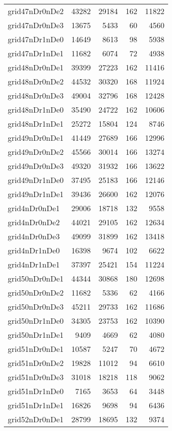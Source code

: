 \begin{longtable}{lrrrr}
grid47nDr0nDe2 & 43282 & 29184 & 162 & 11822 \\
grid47nDr0nDe3 & 13675 & 5433 & 60 & 4560 \\
grid47nDr1nDe0 & 14649 & 8613 & 98 & 5938 \\
grid47nDr1nDe1 & 11682 & 6074 & 72 & 4938 \\
grid48nDr0nDe1 & 39399 & 27223 & 162 & 11416 \\
grid48nDr0nDe2 & 44532 & 30320 & 168 & 11924 \\
grid48nDr0nDe3 & 49004 & 32796 & 168 & 12428 \\
grid48nDr1nDe0 & 35490 & 24722 & 162 & 10606 \\
grid48nDr1nDe1 & 25272 & 15804 & 124 & 8746 \\
grid49nDr0nDe1 & 41449 & 27689 & 166 & 12996 \\
grid49nDr0nDe2 & 45566 & 30014 & 166 & 13274 \\
grid49nDr0nDe3 & 49320 & 31932 & 166 & 13622 \\
grid49nDr1nDe0 & 37495 & 25183 & 166 & 12146 \\
grid49nDr1nDe1 & 39436 & 26600 & 162 & 12076 \\
grid4nDr0nDe1 & 29006 & 18718 & 132 & 9558 \\
grid4nDr0nDe2 & 44021 & 29105 & 162 & 12634 \\
grid4nDr0nDe3 & 49099 & 31899 & 162 & 13418 \\
grid4nDr1nDe0 & 16398 & 9674 & 102 & 6622 \\
grid4nDr1nDe1 & 37397 & 25421 & 154 & 11224 \\
grid50nDr0nDe1 & 44344 & 30868 & 180 & 12698 \\
grid50nDr0nDe2 & 11682 & 5336 & 62 & 4166 \\
grid50nDr0nDe3 & 45211 & 29733 & 162 & 11686 \\
grid50nDr1nDe0 & 34305 & 23753 & 162 & 10390 \\
grid50nDr1nDe1 & 9409 & 4669 & 62 & 4080 \\
grid51nDr0nDe1 & 10587 & 5247 & 70 & 4672 \\
grid51nDr0nDe2 & 19828 & 11012 & 94 & 6610 \\
grid51nDr0nDe3 & 31018 & 18218 & 118 & 9062 \\
grid51nDr1nDe0 & 7165 & 3653 & 64 & 3448 \\
grid51nDr1nDe1 & 16826 & 9698 & 94 & 6436 \\
grid52nDr0nDe1 & 28799 & 18695 & 132 & 9374 \\

\end{longtable}
